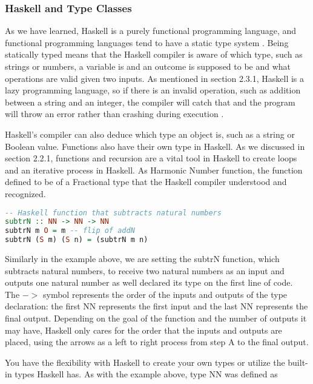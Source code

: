 \documentclass{article}
\begin{document}
\subsubsection{Haskell and Type Classes}

As we have learned, Haskell is a purely functional programming language, and functional programming languages tend to have a static type system \cite{LYH Types}. Being statically typed means that the Haskell compiler is aware of which type, such as strings or numbers, a variable is and an outcome is supposed to be and what operations are valid given two inputs. As mentioned in section 2.3.1, Haskell is a lazy programming language, so if there is an invalid operation, such as addition between a string and an integer, the compiler will catch that and the program will throw an error rather than crashing during execution \cite{LYH Types}. 

\medskip\noindent
Haskell's compiler can also deduce which type an object is, such as a string or Boolean value. Functions also have their own type in Haskell. As we discussed in section 2.2.1, functions and recursion are a vital tool in Haskell to create loops and an iterative process in Haskell. As Harmonic Number function, the function defined to be of a Fractional type that the Haskell compiler understood and recognized.  

\begin{lstlisting}[language=haskell]
-- Haskell function that subtracts natural numbers
subtrN :: NN -> NN -> NN
subtrN m O = m -- flip of addN
subtrN (S m) (S n) = (subtrN m n) 
\end{lstlisting}

\noindent
Similarly in the example above, we are setting the subtrN function, which subtracts natural numbers, to receive two natural numbers as an input and outputs one natural number as well declared its type on the first line of code. The $->$ symbol represents the order of the inputs and outputs of the type declaration: the first NN represents the first input and the last NN represents the final output. Depending on the goal of the function and the number of outputs it may have, Haskell only cares for the order that the inputs and outputs are placed, using the arrows as a left to right process from step A to the final output.

\medskip\noindent
You have the flexibility with Haskell to create your own types or utilize the built-in types Haskell has. As with the example above, type NN was defined as
\end{document}
